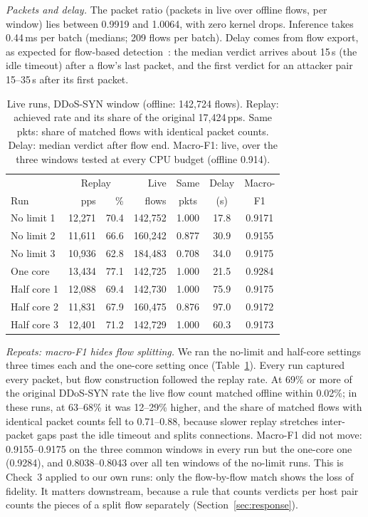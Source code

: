 \emph{Packets and delay.} The packet ratio (packets in live over offline flows, per window) lies between 0.9919 and 1.0064, with zero kernel drops. Inference takes 0.44\,ms per batch (medians; 209 flows per batch). Delay comes from flow export, as expected for flow-based detection~\cite{hofstede2013realtime}: the median verdict arrives about 15\,s (the idle timeout) after a flow's last packet, and the first verdict for an attacker pair 15--35\,s after its first packet.

\begin{table}[t]
\centering
\caption{Live runs, DDoS-SYN window (offline: 142,724 flows). Replay: achieved rate and its share of the original 17,424\,pps. Same pkts: share of matched flows with identical packet counts. Delay: median verdict after flow end. Macro-F1: live, over the three windows tested at every CPU budget (offline 0.914).}
\label{tab:repeats}
\footnotesize
\setlength{\tabcolsep}{2.5pt}
\begin{tabular}{lrrrccc}
\hline
 & \multicolumn{2}{c}{Replay} & Live & Same & Delay & Macro- \\
Run & pps & \% & flows & pkts & (s) & F1 \\
\hline
No limit 1  & 12,271 & 70.4 & 142,752 & 1.000 & 17.8 & 0.9171 \\
No limit 2  & 11,611 & 66.6 & 160,242 & 0.877 & 30.9 & 0.9155 \\
No limit 3  & 10,936 & 62.8 & 184,483 & 0.708 & 34.0 & 0.9175 \\
One core    & 13,434 & 77.1 & 142,725 & 1.000 & 21.5 & 0.9284 \\
Half core 1 & 12,088 & 69.4 & 142,730 & 1.000 & 75.9 & 0.9175 \\
Half core 2 & 11,831 & 67.9 & 160,475 & 0.876 & 97.0 & 0.9172 \\
Half core 3 & 12,401 & 71.2 & 142,729 & 1.000 & 60.3 & 0.9173 \\
\hline
\end{tabular}
\end{table}

\emph{Repeats: macro-F1 hides flow splitting.} We ran the no-limit and half-core settings three times each and the one-core setting once (Table~\ref{tab:repeats}). Every run captured every packet, but flow construction followed the replay rate. At 69\% or more of the original DDoS-SYN rate the live flow count matched offline within 0.02\%; in these runs, at 63--68\% it was 12--29\% higher, and the share of matched flows with identical packet counts fell to 0.71--0.88, because slower replay stretches inter-packet gaps past the idle timeout and splits connections. Macro-F1 did not move: 0.9155--0.9175 on the three common windows in every run but the one-core one (0.9284), and 0.8038--0.8043 over all ten windows of the no-limit runs. This is Check~3 applied to our own runs: only the flow-by-flow match shows the loss of fidelity. It matters downstream, because a rule that counts verdicts per host pair counts the pieces of a split flow separately (Section~\ref{sec:response}).

